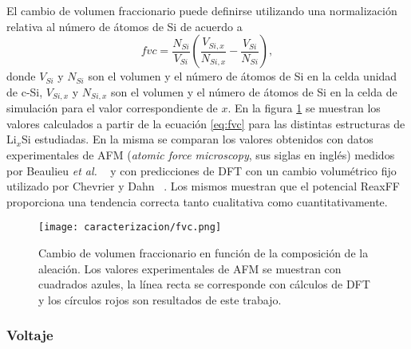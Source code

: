El cambio de volumen fraccionario puede definirse utilizando una normalización 
relativa al número de átomos de Si de acuerdo a
\begin{equation}\label{eq:fvc}
    fvc = \frac{N_{Si}}{V_{Si}} \left( \frac{V_{Si,x}}{N_{Si,x}} - \frac{V_{Si}}{N_{Si}} \right),
\end{equation}
donde $V_{Si}$ y $N_{Si}$ son el volumen y el número de átomos de Si en la celda
unidad de c-Si, $V_{Si,x}$ y $N_{Si,x}$ son el volumen y el número de átomos de Si
en la celda de simulación para el valor correspondiente de $x$. En la figura
\ref{fig:fvc} se muestran los valores calculados a partir de la ecuación 
\ref{eq:fvc} para las distintas estructuras de Li$_x$Si estudiadas. En la misma 
se comparan los valores obtenidos con datos experimentales de AFM (\textit{atomic 
force microscopy}, sus siglas en inglés) medidos por Beaulieu \textit{et al.} 
~\cite{beaulieu2003} y con predicciones de DFT con un cambio volumétrico fijo 
utilizado por Chevrier y Dahn ~\cite{chevrier2009}. Los mismos muestran que el
potencial ReaxFF proporciona una tendencia correcta tanto cualitativa como 
cuantitativamente.
\begin{figure}[th]
    \centering
    \texttt{[image: caracterizacion/fvc.png]}
    \caption{Cambio de volumen fraccionario en función de la composición de la 
    aleación. Los valores experimentales de AFM se muestran con cuadrados azules, 
    la línea recta se corresponde con cálculos de DFT y los círculos rojos son 
    resultados de este trabajo.}
    \label{fig:fvc}
\end{figure}

\subsubsection{Voltaje}

